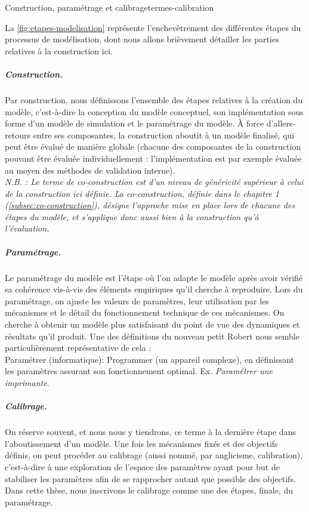 \begin{encadre}{Construction, paramétrage et calibrage}{termes-calibration}
\renewcommand{\thempfootnote}{\alph{mpfootnote}}
	
La \cref{fig:etapes-modelisation} représente l'enchevêtrement des différentes étapes du processus de modélisation, dont nous allons brièvement détailler les parties relatives à la construction ici.
	
\subparagraph{Construction.}
Par construction, nous définissons l'ensemble des étapes relatives à la création du modèle, c'est-à-dire la conception du modèle conceptuel, son implémentation sous forme d'un modèle de simulation et le paramétrage du modèle.
À force d'allers-retours entre ses composantes, la construction aboutit à un modèle \og finalisé\fg{}, qui peut être évalué de manière globale (chacune des composantes de la construction pouvant être évaluée individuellement : l'implémentation est par exemple évaluée au moyen des méthodes de validation interne).\\
\textit{N.B. : Le terme de co-construction est d'un niveau de généricité supérieur à celui de la construction ici définie.
La co-construction, définie dans le chapitre 1 (\cref{subsec:co-construction}), désigne l'approche mise en place lors de chacune des étapes du modèle, et s'applique donc aussi bien à la construction qu'à l'évaluation.}
		
\subparagraph{Paramétrage.}
Le paramétrage du modèle est l'étape où l'on adapte le modèle après avoir vérifié sa cohérence vis-à-vis des éléments empiriques qu'il cherche à reproduire.
Lors du paramétrage, on ajuste les valeurs de paramètres, leur utilisation par les mécanismes et le détail du fonctionnement technique de ces mécanismes.
On cherche à obtenir un modèle plus satisfaisant du point de vue des dynamiques et résultats qu'il produit.
Une des définitions du nouveau petit Robert \autocite{robert_nouveau_1993} nous semble particulièrement représentative de cela :\\
\og Paramétrer (informatique): \og Programmer (un appareil complexe), en définissant les paramètres assurant son fonctionnement optimal.
Ex. \textit{Paramétrer une imprimante}\fg{}.
		
\subparagraph{Calibrage.}
On réserve souvent, et nous nous y tiendrons, ce terme à la dernière étape dans l'aboutissement d'un modèle.
Une fois les mécanismes fixés et des objectifs définis, on peut procéder au calibrage (aussi nommé, par anglicisme, \og calibration\fg{}), c'est-à-dire à une exploration de l'espace des paramètres ayant pour but de stabiliser les paramètres afin de se rapprocher autant que possible des objectifs.
Dans cette thèse, nous inscrivons le calibrage comme une des étapes, finale, du paramétrage.


\end{encadre}
